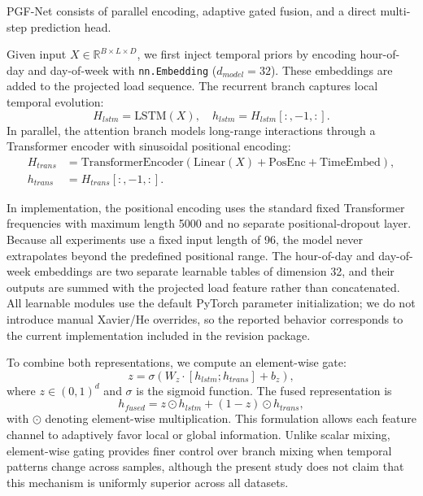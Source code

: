 \documentclass[pdflatex,sn-mathphys-num]{sn-jnl}
\theoremstyle{thmstyleone}
\theoremstyle{thmstyletwo}
\theoremstyle{thmstylethree}
\begin{document}
PGF-Net consists of parallel encoding, adaptive gated fusion, and a direct multi-step prediction head.

Given input $X \in \mathbb{R}^{B \times L \times D}$, we first inject temporal priors by encoding hour-of-day and day-of-week with \texttt{nn.Embedding} ($d_{model}=32$). These embeddings are added to the projected load sequence. The recurrent branch captures local temporal evolution:
\begin{equation}
H_{lstm} = \text{LSTM}(X), \quad h_{lstm} = H_{lstm}[:, -1, :].
\end{equation}
In parallel, the attention branch models long-range interactions through a Transformer encoder with sinusoidal positional encoding:
\begin{equation}
\begin{aligned}
H_{trans} &= \text{TransformerEncoder}(\text{Linear}(X) + \text{PosEnc} + \text{TimeEmbed}), \\
h_{trans} &= H_{trans}[:, -1, :].
\end{aligned}
\end{equation}

In implementation, the positional encoding uses the standard fixed Transformer frequencies with maximum length 5000 and no separate positional-dropout layer. Because all experiments use a fixed input length of 96, the model never extrapolates beyond the predefined positional range. The hour-of-day and day-of-week embeddings are two separate learnable tables of dimension 32, and their outputs are summed with the projected load feature rather than concatenated. All learnable modules use the default PyTorch parameter initialization; we do not introduce manual Xavier/He overrides, so the reported behavior corresponds to the current implementation included in the revision package.

To combine both representations, we compute an element-wise gate:
\begin{equation}
z = \sigma(W_z \cdot [h_{lstm}; h_{trans}] + b_z),
\end{equation}
where $z \in (0,1)^d$ and $\sigma$ is the sigmoid function. The fused representation is
\begin{equation}
h_{fused} = z \odot h_{lstm} + (1 - z) \odot h_{trans},
\end{equation}
with $\odot$ denoting element-wise multiplication. This formulation allows each feature channel to adaptively favor local or global information. Unlike scalar mixing, element-wise gating provides finer control over branch mixing when temporal patterns change across samples, although the present study does not claim that this mechanism is uniformly superior across all datasets.\cite{dauphin2016language}
\end{document}
